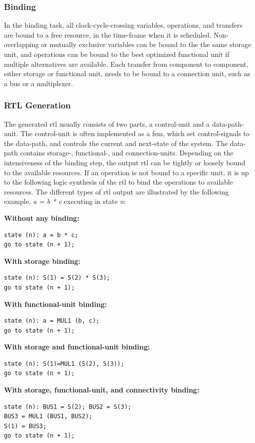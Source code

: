 \subsubsection{Binding}
In the binding task, all clock-cycle-crossing variables, operations, and transfers are bound to a free resource, in the time-frame when it is scheduled. Non-overlapping or mutually exclusive variables can be bound to the the same storage unit, and operations can be bound to the best optimized functional unit if multiple alternatives are available. Each transfer from component to component, either storage or functional unit, needs to be bound to a connection unit, such as a bus or a multiplexer.
\subsubsection{RTL Generation}
The generated \gls{rtl} usually consists of two parts, a control-unit and a data-path-unit. The control-unit is often implemented as a \gls{fsm}, which set control-signals to the data-path, and controls the current and next-state of the system. The data-path contains storage-, functional-, and connection-units. Depending on the intensiveness of the binding step, the output \gls{rtl} can be tightly or loosely bound to the available resources. If an operation is not bound to a specific unit, it is up to the following logic synthesis of the \gls{rtl} to bind the operations to available resources. The different types of \gls{rtl} output are illustrated by the following example. \textit{a = b * c} executing in state \textit{n}:

\begin{minipage}[t][300px]{\textwidth}
\textbf{Without any binding:}%
\begin{verbatim}
state (n): a = b * c;
go to state (n + 1);
\end{verbatim}
\textbf{With storage binding:}%
\begin{verbatim}
state (n): S(1) = S(2) * S(3);
go to state (n + 1);
\end{verbatim}
\textbf{With functional-unit binding:}%
\begin{verbatim}
state (n): a = MUL1 (b, c);
go to state (n + 1);
\end{verbatim}
\textbf{With storage and functional-unit binding:}%
\begin{verbatim}
state (n): S(1)=MUL1 (S(2), S(3));
go to state (n + 1);
\end{verbatim}
\textbf{With storage, functional-unit, and connectivity binding:}%
\begin{verbatim}
state (n): BUS1 = S(2); BUS2 = S(3);
BUS3 = MUL1 (BUS1, BUS2);
S(1) = BUS3;
go to state (n + 1);
\end{verbatim}
\end{minipage}

